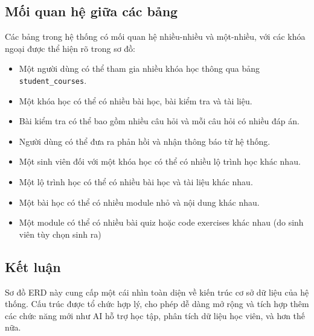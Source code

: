 \subsection{Mối quan hệ giữa các bảng}
Các bảng trong hệ thống có mối quan hệ nhiều-nhiều và một-nhiều, với các khóa ngoại được thể hiện rõ trong sơ đồ:
\begin{itemize}
    \item Một người dùng có thể tham gia nhiều khóa học thông qua bảng \texttt{student\_courses}.
    \item Một khóa học có thể có nhiều bài học, bài kiểm tra và tài liệu.
    \item Bài kiểm tra có thể bao gồm nhiều câu hỏi và mỗi câu hỏi có nhiều đáp án.
    \item Người dùng có thể đưa ra phản hồi và nhận thông báo từ hệ thống.
    \item Một sinh viên đối với một khóa học có thể có nhiều lộ trình học khác nhau. 
    \item Một lộ trình học có thể có nhiều bài học và tài liệu khác nhau.
    \item Một bài học có thể có nhiều module nhỏ và nội dung khác nhau.
    \item Một module có thể có nhiều bài quiz hoặc code exercises khác nhau (do sinh viên tùy chọn sinh ra)
\end{itemize}

\subsection{Kết luận}
Sơ đồ ERD này cung cấp một cái nhìn toàn diện về kiến trúc cơ sở dữ liệu của hệ thống. Cấu trúc được tổ chức hợp lý, cho phép dễ dàng mở rộng và tích hợp thêm các chức năng mới như AI hỗ trợ học tập, phân tích dữ liệu học viên, và hơn thế nữa.
